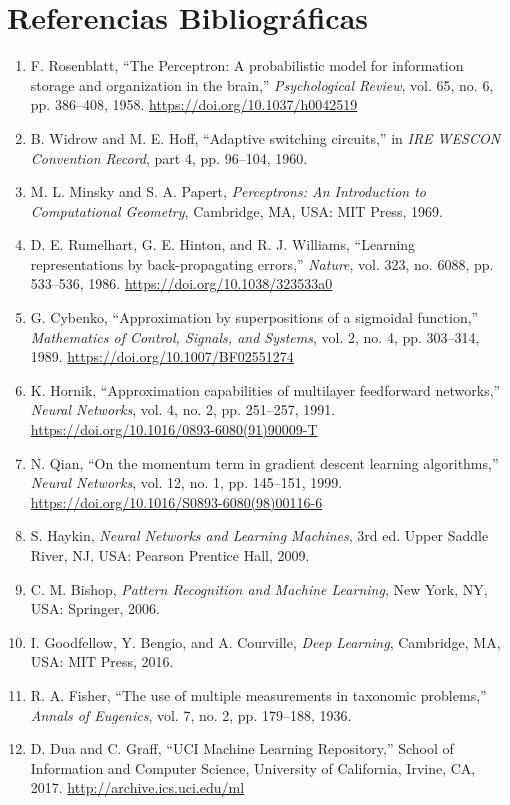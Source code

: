 \documentclass{article}
\begin{document}
\section{Referencias Bibliográficas}
\label{sec:referencias}

\begin{enumerate}
    \item F. Rosenblatt, ``The Perceptron: A probabilistic model for information storage and organization in the brain,'' \textit{Psychological Review}, vol. 65, no. 6, pp. 386--408, 1958. \url{https://doi.org/10.1037/h0042519}
    \item B. Widrow and M. E. Hoff, ``Adaptive switching circuits,'' in \textit{IRE WESCON Convention Record}, part 4, pp. 96--104, 1960.
    \item M. L. Minsky and S. A. Papert, \textit{Perceptrons: An Introduction to Computational Geometry}, Cambridge, MA, USA: MIT Press, 1969.
    \item D. E. Rumelhart, G. E. Hinton, and R. J. Williams, ``Learning representations by back-propagating errors,'' \textit{Nature}, vol. 323, no. 6088, pp. 533--536, 1986. \url{https://doi.org/10.1038/323533a0}
    \item G. Cybenko, ``Approximation by superpositions of a sigmoidal function,'' \textit{Mathematics of Control, Signals, and Systems}, vol. 2, no. 4, pp. 303--314, 1989. \url{https://doi.org/10.1007/BF02551274}
    \item K. Hornik, ``Approximation capabilities of multilayer feedforward networks,'' \textit{Neural Networks}, vol. 4, no. 2, pp. 251--257, 1991. \url{https://doi.org/10.1016/0893-6080(91)90009-T}
    \item N. Qian, ``On the momentum term in gradient descent learning algorithms,'' \textit{Neural Networks}, vol. 12, no. 1, pp. 145--151, 1999. \url{https://doi.org/10.1016/S0893-6080(98)00116-6}
    \item S. Haykin, \textit{Neural Networks and Learning Machines}, 3rd ed. Upper Saddle River, NJ, USA: Pearson Prentice Hall, 2009.
    \item C. M. Bishop, \textit{Pattern Recognition and Machine Learning}, New York, NY, USA: Springer, 2006.
    \item I. Goodfellow, Y. Bengio, and A. Courville, \textit{Deep Learning}, Cambridge, MA, USA: MIT Press, 2016.
    \item R. A. Fisher, ``The use of multiple measurements in taxonomic problems,'' \textit{Annals of Eugenics}, vol. 7, no. 2, pp. 179--188, 1936.
    \item D. Dua and C. Graff, ``UCI Machine Learning Repository,'' School of Information and Computer Science, University of California, Irvine, CA, 2017. \url{http://archive.ics.uci.edu/ml}
\end{enumerate}
\end{document}
